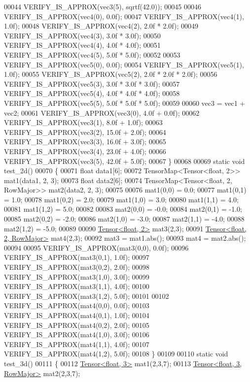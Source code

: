 \begin{DoxyCode}
00044   VERIFY\_IS\_APPROX(vec3(5), sqrtf(42.0));
00045 
00046   VERIFY\_IS\_APPROX(vec4(0), 0.0f);
00047   VERIFY\_IS\_APPROX(vec4(1), 1.0f);
00048   VERIFY\_IS\_APPROX(vec4(2), 2.0f * 2.0f);
00049   VERIFY\_IS\_APPROX(vec4(3), 3.0f * 3.0f);
00050   VERIFY\_IS\_APPROX(vec4(4), 4.0f * 4.0f);
00051   VERIFY\_IS\_APPROX(vec4(5), 5.0f * 5.0f);
00052 
00053   VERIFY\_IS\_APPROX(vec5(0), 0.0f);
00054   VERIFY\_IS\_APPROX(vec5(1), 1.0f);
00055   VERIFY\_IS\_APPROX(vec5(2), 2.0f * 2.0f * 2.0f);
00056   VERIFY\_IS\_APPROX(vec5(3), 3.0f * 3.0f * 3.0f);
00057   VERIFY\_IS\_APPROX(vec5(4), 4.0f * 4.0f * 4.0f);
00058   VERIFY\_IS\_APPROX(vec5(5), 5.0f * 5.0f * 5.0f);
00059 
00060   vec3 = vec1 + vec2;
00061   VERIFY\_IS\_APPROX(vec3(0), 4.0f + 0.0f);
00062   VERIFY\_IS\_APPROX(vec3(1), 8.0f + 1.0f);
00063   VERIFY\_IS\_APPROX(vec3(2), 15.0f + 2.0f);
00064   VERIFY\_IS\_APPROX(vec3(3), 16.0f + 3.0f);
00065   VERIFY\_IS\_APPROX(vec3(4), 23.0f + 4.0f);
00066   VERIFY\_IS\_APPROX(vec3(5), 42.0f + 5.0f);
00067 \}
00068 
00069 \textcolor{keyword}{static} \textcolor{keywordtype}{void} test\_2d()
00070 \{
00071   \textcolor{keywordtype}{float} data1[6];
00072   TensorMap<Tensor<float, 2>> mat1(data1, 2, 3);
00073   \textcolor{keywordtype}{float} data2[6];
00074   TensorMap<Tensor<float, 2, RowMajor>> mat2(data2, 2, 3);
00075 
00076   mat1(0,0) = 0.0;
00077   mat1(0,1) = 1.0;
00078   mat1(0,2) = 2.0;
00079   mat1(1,0) = 3.0;
00080   mat1(1,1) = 4.0;
00081   mat1(1,2) = 5.0;
00082 
00083   mat2(0,0) = -0.0;
00084   mat2(0,1) = -1.0;
00085   mat2(0,2) = -2.0;
00086   mat2(1,0) = -3.0;
00087   mat2(1,1) = -4.0;
00088   mat2(1,2) = -5.0;
00089 
00090   \hyperlink{class_eigen_1_1_tensor}{Tensor<float, 2>} mat3(2,3);
00091   \hyperlink{class_eigen_1_1_tensor}{Tensor<float, 2, RowMajor>} mat4(2,3);
00092   mat3 = mat1.abs();
00093   mat4 = mat2.abs();
00094 
00095   VERIFY\_IS\_APPROX(mat3(0,0), 0.0f);
00096   VERIFY\_IS\_APPROX(mat3(0,1), 1.0f);
00097   VERIFY\_IS\_APPROX(mat3(0,2), 2.0f);
00098   VERIFY\_IS\_APPROX(mat3(1,0), 3.0f);
00099   VERIFY\_IS\_APPROX(mat3(1,1), 4.0f);
00100   VERIFY\_IS\_APPROX(mat3(1,2), 5.0f);
00101 
00102   VERIFY\_IS\_APPROX(mat4(0,0), 0.0f);
00103   VERIFY\_IS\_APPROX(mat4(0,1), 1.0f);
00104   VERIFY\_IS\_APPROX(mat4(0,2), 2.0f);
00105   VERIFY\_IS\_APPROX(mat4(1,0), 3.0f);
00106   VERIFY\_IS\_APPROX(mat4(1,1), 4.0f);
00107   VERIFY\_IS\_APPROX(mat4(1,2), 5.0f);
00108 \}
00109 
00110 \textcolor{keyword}{static} \textcolor{keywordtype}{void} test\_3d()
00111 \{
00112   \hyperlink{class_eigen_1_1_tensor}{Tensor<float, 3>} mat1(2,3,7);
00113   \hyperlink{class_eigen_1_1_tensor}{Tensor<float, 3, RowMajor>} mat2(2,3,7);

\end{DoxyCode}
